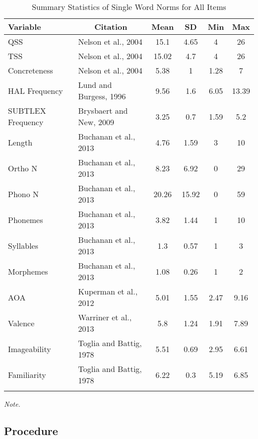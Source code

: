 \documentclass[english,man]{apa6}
\theoremstyle{definition}
\theoremstyle{definition}
\theoremstyle{definition}
\theoremstyle{remark}
\begin{document}
\begin{table}[tbp]
\begin{center}
\begin{threeparttable}
\caption{\label{tab:unnamed-chunk-4}Summary Statistics of Single Word Norms for All Items}
\begin{tabular}{llcccc}
\toprule
Variable & \multicolumn{1}{c}{Citation} & \multicolumn{1}{c}{Mean} & \multicolumn{1}{c}{SD} & \multicolumn{1}{c}{Min} & \multicolumn{1}{c}{Max}\\
\midrule
QSS & Nelson et al., 2004 & 15.1 & 4.65 & 4 & 26\\
TSS & Nelson et al., 2004 & 15.02 & 4.7 & 4 & 26\\
Concreteness & Nelson et al., 2004 & 5.38 & 1 & 1.28 & 7\\
HAL Frequency & Lund and Burgess, 1996 & 9.56 & 1.6 & 6.05 & 13.39\\
SUBTLEX Frequency & Brysbaert and New, 2009 & 3.25 & 0.7 & 1.59 & 5.2\\
Length & Buchanan et al., 2013 & 4.76 & 1.59 & 3 & 10\\
Ortho N & Buchanan et al., 2013 & 8.23 & 6.92 & 0 & 29\\
Phono N & Buchanan et al., 2013 & 20.26 & 15.92 & 0 & 59\\
Phonemes & Buchanan et al., 2013 & 3.82 & 1.44 & 1 & 10\\
Syllables & Buchanan et al., 2013 & 1.3 & 0.57 & 1 & 3\\
Morphemes & Buchanan et al., 2013 & 1.08 & 0.26 & 1 & 2\\
AOA & Kuperman et al., 2012 & 5.01 & 1.55 & 2.47 & 9.16\\
Valence & Warriner et al., 2013 & 5.8 & 1.24 & 1.91 & 7.89\\
Imageability & Toglia and Battig, 1978 & 5.51 & 0.69 & 2.95 & 6.61\\
Familiarity & Toglia and Battig, 1978 & 6.22 & 0.3 & 5.19 & 6.85\\
\bottomrule
\addlinespace
\end{tabular}
\begin{tablenotes}[para]
\textit{Note.} 
\end{tablenotes}
\end{threeparttable}
\end{center}
\end{table}

\subsection{Procedure}\label{procedure}
\end{document}
